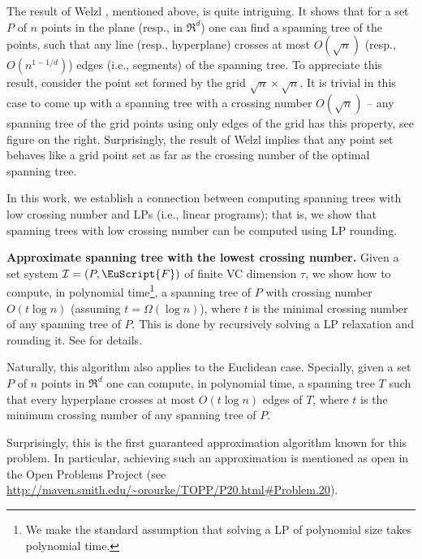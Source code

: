 \documentclass[12pt]{article}
\newcommand{\PntSet}{P}
\newcommand{\Term}[1]{\textsf{#1}}
\newcommand{\LP}{\Term{L{}P}\xspace}
\newcommand{\VC}{\Term{V{C}}\xspace}
\newcommand{\Family}{\EuScript{F}}
\newcommand{\Dim}{\tau}
\newcommand{\I}{\mathcal{I}}
\begin{document}

The result of Welzl \cite{w-stlcn-92}, mentioned above, is quite
intriguing. It shows that for a set $\PntSet$ of $n$ points in the
plane (resp., in $\Re^d$) one can find a spanning tree of the points,
such that any line (resp., hyperplane) crosses at most $O(\sqrt{n})$
(resp., $O(n^{1-1/d})$) edges (i.e., segments) of the spanning tree.
To appreciate this result, consider the point set formed by the grid
$\sqrt{n} \times \sqrt{n}$. It is trivial in this case to come up with
a spanning tree with a crossing number $O( \sqrt{n})$ -- any spanning
tree of the grid points using only edges of the grid has this
property, see figure on the right. Surprisingly, the result of Welzl
\cite{w-stlcn-92} implies that any point set behaves like a grid point
set as far as the crossing number of the optimal spanning tree.


\bigskip In this work, we establish a connection between computing
spanning trees with low crossing number and \LP{}s (i.e., linear
programs); that is, we show that spanning trees with low crossing
number can be computed using \LP rounding.


\medskip
\noindent
\textbf{Approximate spanning tree with the lowest crossing number.}
Given a set system $\I = (\PntSet, \Family)$ of finite \VC dimension
$\Dim$, we show how to compute, in polynomial time\footnote{We make the standard assumption that solving a \LP of
   polynomial size takes polynomial time.}, a spanning tree of $\PntSet$ with crossing number $O(t \log n)$
(assuming $t =\Omega( \log n)$), where $t$ is the minimal crossing
number of any spanning tree of $\PntSet$.  This is done by recursively
solving a \LP relaxation and rounding it.  See 
for details.




Naturally, this algorithm also applies to the Euclidean case.
Specially, given a set $\PntSet$ of $n$ points in $\Re^d$ one can
compute, in polynomial time, a spanning tree $T$ such that every
hyperplane crosses at most $O(t \log n)$ edges of $T$, where $t$ is
the minimum crossing number of any spanning tree of $\PntSet$.  

Surprisingly, this is the first guaranteed approximation algorithm
known for this problem. In particular, achieving such an approximation
is mentioned as open in the Open Problems Project (see
\url{http://maven.smith.edu/~orourke/TOPP/P20.html#Problem.20}).
\end{document}
